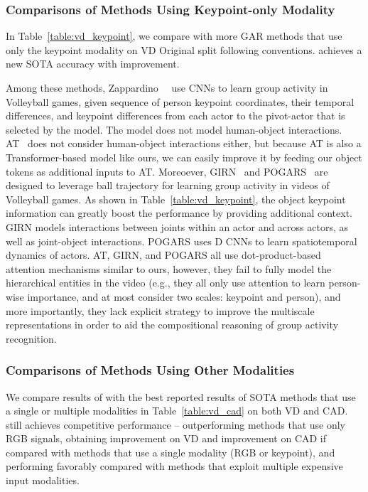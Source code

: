 \documentclass[runningheads]{llncs}
\begin{document}
\subsubsection{Comparisons of Methods Using Keypoint-only Modality}
In Table~\ref{table:vd_keypoint}, we compare \ours with more GAR methods that use
only the keypoint modality
on VD Original split following conventions. 
\ours achieves a new SOTA
 accuracy with  improvement.


Among these methods, Zappardino~\etal~\cite{zappardino2021learning} use CNNs to learn group activity in Volleyball games,
given sequence of person keypoint coordinates, their temporal differences, and keypoint differences from each actor to the pivot-actor that is selected by the model. The model does not model human-object interactions.
AT~\cite{actor-transformer} does not consider human-object interactions either, but because AT is also a Transformer-based  model like ours, we can easily improve it by feeding our object tokens as additional 
inputs to AT.
Moreoever, GIRN~\cite{GIRN} and POGARS~\cite{POGARS} are designed to leverage ball trajectory for learning group activity in videos of Volleyball games.
As shown in Table~\ref{table:vd_keypoint},  the object keypoint information can greatly boost the performance 
by providing additional context.
GIRN models interactions between joints within an actor and across actors, as well as joint-object interactions.
POGARS uses D CNNs to learn spatiotemporal dynamics of actors. 
AT, GIRN, and POGARS all use dot-product-based attention mechanisms similar to ours, however, they fail to fully model the hierarchical entities in the video (e.g., they all only use attention to learn person-wise importance, and at most consider two scales: keypoint and person), 
and more importantly, they lack explicit strategy 
to improve the multiscale representations in order to aid the compositional reasoning of group activity recognition.

 
 

 
 
  

  
   
  
\subsubsection{Comparisons of Methods Using Other Modalities}
We compare results of \ours with the best reported results of SOTA methods that use a single or multiple modalities in Table~\ref{table:vd_cad} on both VD and CAD.
\ours still achieves competitive performance --
outperforming methods that use only RGB signals, obtaining  improvement on VD and  improvement on CAD if compared with methods that use a single modality (RGB or keypoint),
and performing favorably compared with methods that exploit multiple expensive input modalities.
\end{document}
